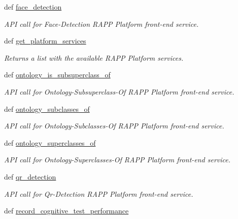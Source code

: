 \begin{DoxyCompactItemize}
def \hyperlink{classRappCloud_1_1RappCloud_1_1RappCloud_a9b587dd2a3fb6f76107b4221fc64441a}{face\-\_\-detection}
\begin{DoxyCompactList}\small\item\em A\-P\-I call for Face-\/\-Detection R\-A\-P\-P Platform front-\/end service. \end{DoxyCompactList}\item 
def \hyperlink{classRappCloud_1_1RappCloud_1_1RappCloud_a395db38a4457e11d7cc796cde6ce0836}{get\-\_\-platform\-\_\-services}
\begin{DoxyCompactList}\small\item\em Returns a list with the available R\-A\-P\-P Platform services. \end{DoxyCompactList}\item 
def \hyperlink{classRappCloud_1_1RappCloud_1_1RappCloud_a5e492f2f9d4ef4c41e4e74d695671180}{ontology\-\_\-is\-\_\-subsuperclass\-\_\-of}
\begin{DoxyCompactList}\small\item\em A\-P\-I call for Ontology-\/\-Subsuperclass-\/\-Of R\-A\-P\-P Platform front-\/end service. \end{DoxyCompactList}\item 
def \hyperlink{classRappCloud_1_1RappCloud_1_1RappCloud_ab9baeea56df92e1fabaca94a0108ce76}{ontology\-\_\-subclasses\-\_\-of}
\begin{DoxyCompactList}\small\item\em A\-P\-I call for Ontology-\/\-Subclasses-\/\-Of R\-A\-P\-P Platform front-\/end service. \end{DoxyCompactList}\item 
def \hyperlink{classRappCloud_1_1RappCloud_1_1RappCloud_ab19555a7a68ec5a4e637f21056fee2af}{ontology\-\_\-superclasses\-\_\-of}
\begin{DoxyCompactList}\small\item\em A\-P\-I call for Ontology-\/\-Superclasses-\/\-Of R\-A\-P\-P Platform front-\/end service. \end{DoxyCompactList}\item 
def \hyperlink{classRappCloud_1_1RappCloud_1_1RappCloud_a48cdf2409b0d5bcd2be12b7fadbcea86}{qr\-\_\-detection}
\begin{DoxyCompactList}\small\item\em A\-P\-I call for Qr-\/\-Detection R\-A\-P\-P Platform front-\/end service. \end{DoxyCompactList}\item 
def \hyperlink{classRappCloud_1_1RappCloud_1_1RappCloud_a7bd686d774419142ba54c8f070da83e9}{record\-\_\-cognitive\-\_\-test\-\_\-performance}

\end{DoxyCompactItemize}
